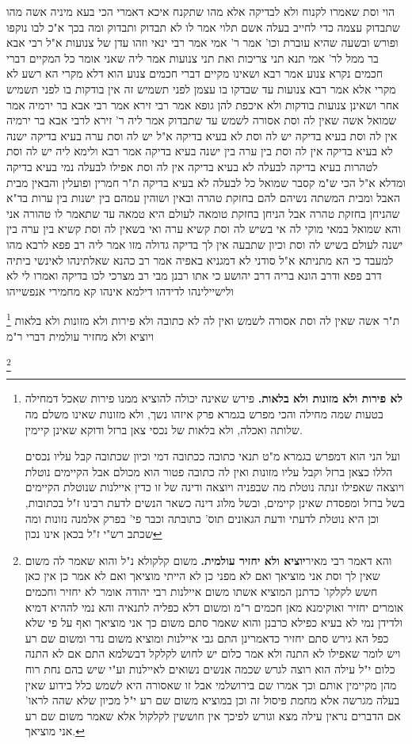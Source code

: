 \documentclass[12pt, openany]{book}
\newcommand{\footnotecomment}[1]{
	\renewcommand\thefootnote{}
	\footnote{#1}}
\newcommand{\commenta}[1]{\footnotecomment{#1}}
\begin{document}
{הוי וסת שאמרו לקנוח ולא לבדיקה אלא מהו שתקנח 
איכא דאמרי הכי בעא מיניה אשה מהו שתבדוק עצמה כדי לחייב בעלה אשם תלוי אמר לו לא תבדוק ותבדוק ומה בכך א"כ לבו נוקפו ופורש
ובשעה שהיא עוברת וכו' אמר ר' אמי אמר רבי ינאי וזהו עדן של צנועות א"ל רבי אבא בר ממל לר' אמי תנא תני צריכות ואת תני צנועות אמר ליה שאני אומר כל המקיים דברי חכמים נקרא צנוע 
אמר רבא ושאינו מקיים דברי חכמים צנוע הוא דלא מקרי הא רשע לא מקרי אלא אמר רבא צנועות עד שבדקו בו עצמן לפני תשמיש זה אין בודקות בו לפני תשמיש אחר ושאינן צנועות בודקות ולא איכפת להן 
גופא אמר רבי זירא אמר רבי אבא בר ירמיה אמר שמואל אשה שאין לה וסת אסורה לשמש עד שתבדוק אמר ליה ר' זירא לרבי אבא בר ירמיה אין לה וסת בעיא בדיקה יש לה וסת לא בעיא בדיקה 
א"ל יש לה וסת ערה בעיא בדיקה ישנה לא בעיא בדיקה אין לה וסת בין ערה בין ישנה בעיא בדיקה 
אמר רבא ולימא ליה יש לה וסת לטהרות בעיא בדיקה לבעלה לא בעיא בדיקה אין לה וסת אפילו לבעלה נמי בעיא בדיקה ומדלא א"ל הכי ש"מ קסבר שמואל כל לבעלה לא בעיא בדיקה 
ת"ר חמרין ופועלין והבאין מבית האבל ומבית המשתה נשיהם להם בחזקת טהרה ובאין ושוהין עמהם בין ישנות בין ערות בד"א שהניחן בחזקת טהרה אבל הניחן בחזקת טומאה לעולם היא טמאה עד שתאמר לו טהורה אני 
והא שמואל במאי מוקי לה אי בשיש לה וסת קשיא ערה ואי בשאין לה וסת קשיא בין ערה בין ישנה 
לעולם בשיש לה וסת וכיון שתבעה אין לך בדיקה גדולה מזו אמר ליה רב פפא לרבא מהו למעבד כי הא מתניתא
א"ל סודני לא דמגניא באפיה אמר רב כהנא שאלתינהו לאינשי ביתיה דרב פפא ודרב הונא בריה דרב יהושע כי אתו רבנן מבי רב מצרכי לכו בדיקה ואמרו לי לא ולישיילינהו לדידהו דילמא אינהו קא מחמירי אנפשייהו 
\commenta{\textbf{לא פירות ולא מזונות ולא בלאות.} פירש שאינה יכולה להוציא ממנו פירות שאכל דמחילה בטעות שמה מחילה והכי מפרש בגמרא פרק איזהו נשך, ולא מזונות שאינו משלם מה שלותה ואכלה, ולא בלאות של נכסי צאן ברזל ודוקא שאינן קיימין.\par ועל הני הוא דמפרש בגמרא מ"ט תנאי כתובה ככתובה דמי וכיון שכתובה קבל עליו נכסים הללו כצאן ברזל וקבל עליו מזונות ואין לה כתובה פטור הוא מכולם אבל הקיימים נוטלת ויוצאה שאפילו זנתה נוטלת מה שבפניה ויוצאה ודינה של זו כדין איילנות שנוטלת הקיימים בשל ברזל ומפסדת שאינן קיימים, ובשל מלוג דינה כשאר הנשים לדעת רבינו ז"ל בכתובות, וכן היא נוטלת לדעתי ודעת הגאונים תוס' כתובתה וכבר פי' בפרק אלמנה נזונות ומה שכתב רש"י ז"ל בכאן אינו נכון }
ת"ר אשה שאין לה וסת אסורה לשמש ואין לה לא כתובה ולא פירות ולא מזונות ולא בלאות ויוציא ולא מחזיר עולמית דברי ר"מ 
\commenta{ והא דאמר רבי מאיר\textbf{יוציא ולא יחזיר עולמית.} משום קלקולא נ"ל והוא שאמר לה משום שאין לך וסת אני מוציאך ואם לא מפני כן לא הייתי מוציאך ואם לא אמר כן אין כאן חשש לקלקו' כדתנן המוציא אשתו משום איילנות רבי יהודה אומר לא יחזיר וחכמים אומרים יחזיר ואוקימנא מאן חכמים ר"מ ומשום דלא כפליה לתנאיה והא נמי לההיא דמיא ולדידן נמי לא בעיא כפילא כרבנן והוא שאמר סתם משום כך אני מוציאך ואף על פי שלא כפל הא גירש סתם יחזיר כדאמרינן התם גבי איילנות ומוציא משום נדר ומשום שם רע ויש לומר שאפילו לא התנה ולא אמר כלום יש לחוש לקלקל דבשלמא התם אם לא התנה כלום י"ל עילה הוא רוצה לגרש שכמה אנשים נשואים לאיילנות וע"י שיש בהם נחת רוח מהן מקיימין אותם וכך אמרו שם בירושלמי אבל זו שאסורה היא לשמש כלל בידוע שאין בעלה מגרשה אלא מחמת פיסול זה וכן במוציא משום שם רע י"ל מכיון שלא שהה לראו' אם הדברים נראין עילה מצא וגורש לפיכך אין חוששין לקלקול אלא שאמר משום שם רע אני מוציאך. }
}
\end{document}
